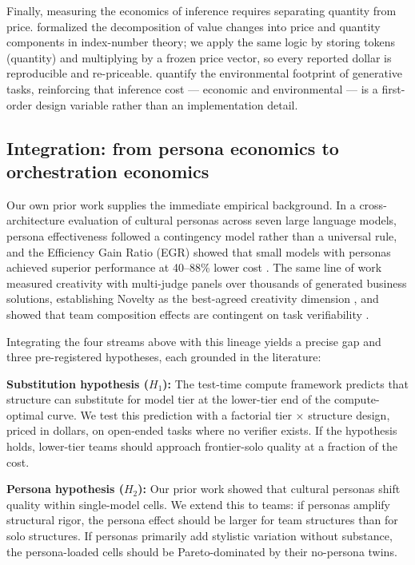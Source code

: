 \documentclass[12pt,a4paper]{article}
\begin{document}
Finally, measuring the economics of inference requires separating quantity from
price. \citet{Diewert1976} formalized the decomposition of value changes into
price and quantity components in index-number theory; we apply the same logic
by storing tokens (quantity) and multiplying by a frozen price vector, so every
reported dollar is reproducible and re-priceable. \citet{TomlinsonEtAl2024}
quantify the environmental footprint of generative tasks, reinforcing that
inference cost --- economic and environmental --- is a first-order design
variable rather than an implementation detail.

\subsection{Integration: from persona economics to orchestration economics}

Our own prior work supplies the immediate empirical background. In a
cross-architecture evaluation of cultural personas across seven large language
models, persona effectiveness followed a contingency model rather than a
universal rule, and the Efficiency Gain Ratio (EGR) showed that small models
with personas achieved superior performance at 40--88\% lower cost
\citep{Hariri2026b}. The same line of work measured creativity with multi-judge
panels over thousands of generated business solutions, establishing Novelty as
the best-agreed creativity dimension \citep{Hariri2025a}, and showed that team
composition effects are contingent on task verifiability \citep{Hariri2025b}.

Integrating the four streams above with this lineage yields a precise gap and
three pre-registered hypotheses, each grounded in the literature:

\medskip
\noindent\textbf{Substitution hypothesis ($H_1$):} The test-time compute
framework \citep{SnellEtAl2024} predicts that structure can substitute for
model tier at the lower-tier end of the compute-optimal curve. We test this
prediction with a factorial tier $\times$ structure design, priced in dollars,
on open-ended tasks where no verifier exists. If the hypothesis holds, lower-tier
teams should approach frontier-solo quality at a fraction of the cost.

\medskip
\noindent\textbf{Persona hypothesis ($H_2$):} Our prior work
\citep{Hariri2026b} showed that cultural personas shift quality within
single-model cells. We extend this to teams: if personas amplify structural
rigor, the persona effect should be larger for team structures than for solo
structures. If personas primarily add stylistic variation without substance, the
persona-loaded cells should be Pareto-dominated by their no-persona twins.
\end{document}
